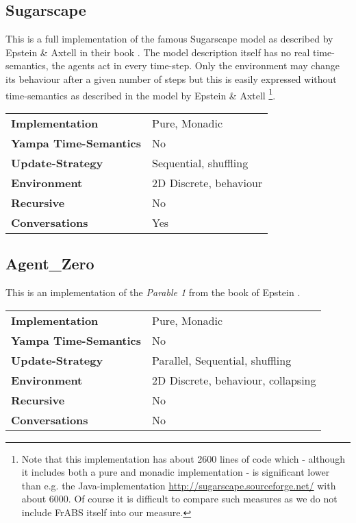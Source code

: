 \subsection{Sugarscape}
This is a full implementation of the famous Sugarscape model as described by Epstein \& Axtell in their book \cite{epstein_growing_1996}. The model description itself has no real time-semantics, the agents act in every time-step. Only the environment may change its behaviour after a given number of steps but this is easily expressed without time-semantics as described in the model by Epstein \& Axtell \footnote{Note that this implementation has about 2600 lines of code which - although it includes both a pure and monadic implementation - is significant lower than e.g. the Java-implementation \url{http://sugarscape.sourceforge.net/} with about 6000. Of course it is difficult to compare such measures as we do not include FrABS itself into our measure.}.

\begin{center}
\begin{tabular}{l || l }
\textbf{Implementation}			& Pure, Monadic \\
\textbf{Yampa Time-Semantics}	& No \\
\textbf{Update-Strategy}		& Sequential, shuffling \\
\textbf{Environment}			& 2D Discrete, behaviour \\
\textbf{Recursive}				& No \\
\textbf{Conversations}			& Yes \\
\end{tabular}
\end{center}

\subsection{Agent\_Zero}
This is an implementation of the \textit{Parable 1} from the book of Epstein \cite{epstein_agent_zero:_2014}.

\begin{center}
\begin{tabular}{l || l }
\textbf{Implementation}			& Pure, Monadic \\
\textbf{Yampa Time-Semantics}	& No \\
\textbf{Update-Strategy}		& Parallel, Sequential, shuffling \\
\textbf{Environment}			& 2D Discrete, behaviour, collapsing \\
\textbf{Recursive}				& No \\
\textbf{Conversations}			& No \\
\end{tabular}
\end{center}

